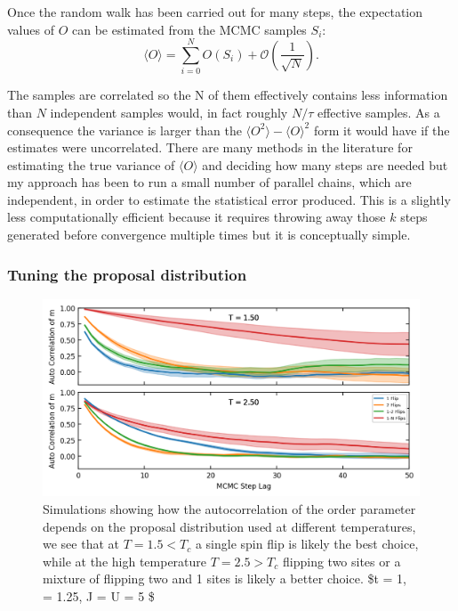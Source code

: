 Once the random walk has been carried out for many steps, the expectation values of \(O\) can be estimated from the MCMC samples \(S_i\): \[
    \langle O \rangle = \sum_{i = 0}^{N} O(S_i) + \mathcal{O}(\frac{1}{\sqrt{N}}).
\]

The samples are correlated so the N of them effectively contains less information than \(N\) independent samples would, in fact roughly \(N/\tau\) effective samples. As a consequence the variance is larger than the \(\langle O^2 \rangle - \langle O \rangle ^2\) form it would have if the estimates were uncorrelated. There are many methods in the literature for estimating the true variance of \(\langle O \rangle\) and deciding how many steps are needed but my approach has been to run a small number of parallel chains, which are independent, in order to estimate the statistical error produced. This is a slightly less computationally efficient because it requires throwing away those \(k\) steps generated before convergence multiple times but it is conceptually simple.

\hypertarget{tuning-the-proposal-distribution}{%
\subsubsection{Tuning the proposal distribution}\label{tuning-the-proposal-distribution}}

\hypertarget{fig:autocorr_multiple_proposals}{%
\begin{figure}
\centering
\includegraphics[width=1\textwidth,height=\textheight]{figure_code/fk_chapter/lsr/figs/autocorr_multiple_proposals.png}
\caption[{Comparison of different proposal distributions}]{Simulations showing how the autocorrelation of the order parameter depends on the proposal distribution used at different temperatures, we see that at \(T = 1.5 < T_c\) a single spin flip is likely the best choice, while at the high temperature \(T = 2.5 > T_c\) flipping two sites or a mixture of flipping two and 1 sites is likely a better choice. \$t = 1, \alpha = 1.25, J = U = 5 \$}
\label{fig:autocorr_multiple_proposals}
\end{figure}
}

